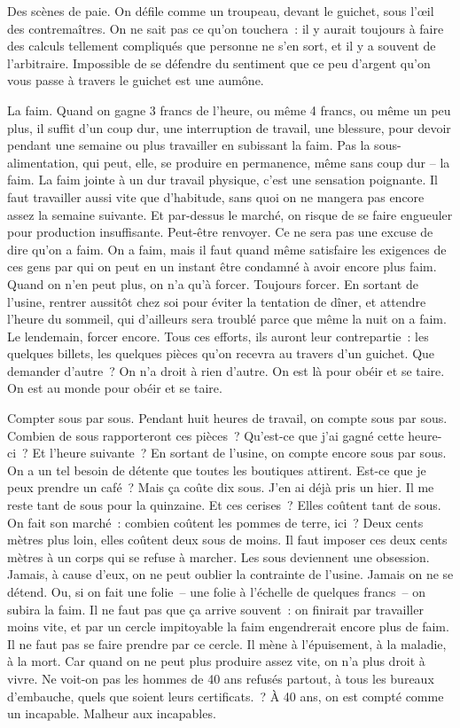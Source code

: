 \documentclass[french,twoside]{book} %
\begin{document}
Des scènes de paie. On défile comme un troupeau, devant le guichet, sous l'œil des contremaîtres. On ne sait pas ce qu'on touchera : il y aurait toujours à faire des calculs tellement compliqués que personne ne s'en sort, et il y a souvent de l'arbitraire. Impossible de se défendre du sentiment que ce peu d'argent qu'on vous passe à travers le guichet est une aumône.\par
La faim. Quand on gagne 3 francs de l'heure, ou même 4 francs, ou même un peu plus, il suffit d'un coup dur, une interruption de travail, une blessure, pour devoir pendant une semaine ou plus travailler en subissant la faim. Pas la sous-alimentation, qui peut, elle, se produire en permanence, même sans coup dur – la faim. La faim jointe à un dur travail physique, c'est une sensation poignante. Il faut travailler aussi vite que d'habitude, sans quoi on ne mangera pas encore assez la semaine suivante. Et par-dessus le marché, on risque de se faire engueuler pour production insuffisante. Peut-être renvoyer. Ce ne sera pas une excuse de dire qu'on a faim. On a faim, mais il faut quand même satisfaire les exigences de ces gens par qui on peut en un instant être condamné à avoir encore plus faim. Quand on n'en peut plus, on n'a qu'à forcer. Toujours forcer. En sortant de l'usine, rentrer aussitôt chez soi pour éviter la tentation de dîner, et attendre l'heure du sommeil, qui d'ailleurs sera troublé parce que même la nuit on a faim. Le lendemain, forcer encore. Tous ces efforts, ils auront leur contrepartie : les quelques billets, les quelques pièces qu'on recevra au travers d'un guichet. Que demander d'autre ? On n'a droit à rien d'autre. On est là pour obéir et se taire. On est au monde pour obéir et se taire.\par
Compter sous par sous. Pendant huit heures de travail, on compte sous par sous. Combien de sous rapporteront ces pièces ? Qu'est-ce que j'ai gagné cette heure-ci ? Et l'heure suivante ? En sortant de l'usine, on compte encore sous par sous. On a un tel besoin de détente que toutes les boutiques attirent. Est-ce que je peux prendre un café ? Mais ça coûte dix sous. J'en ai déjà pris un hier. Il me reste tant de sous pour la quinzaine. Et ces cerises ? Elles coûtent tant de sous. On fait son marché : combien coûtent les pommes de terre, ici ? Deux cents mètres plus loin, elles coûtent deux sous de moins. Il faut imposer ces deux cents mètres à un corps qui se refuse à marcher. Les sous deviennent une obsession. Jamais, à cause d'eux, on ne peut oublier la contrainte de l'usine. Jamais on ne se détend. Ou, si on fait une folie – une folie à l'échelle de quelques francs – on subira la faim. Il ne faut pas que ça arrive souvent : on finirait par travailler moins vite, et par un cercle impitoyable la faim engendrerait encore plus de faim. Il ne faut pas se faire prendre par ce cercle. Il mène à l'épuisement, à la maladie, à la mort. Car quand on ne peut plus produire assez vite, on n'a plus droit à vivre. Ne voit-on pas les hommes de 40 ans refusés partout, à tous les bureaux d'embauche, quels que soient leurs certificats. ? À 40 ans, on est compté comme un incapable. Malheur aux incapables.\par
\end{document}
